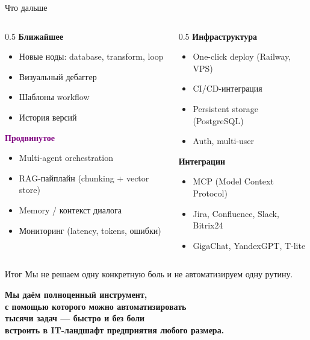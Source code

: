 \documentclass[aspectratio=169, 12pt]{beamer}
\begin{document}
\begin{frame}{Что дальше}
\begin{columns}[T]
\begin{column}{0.5\textwidth}
\textbf{\textcolor{accent}{Ближайшее}}
\begin{itemize}\small
    \item Новые ноды: database, transform, loop
    \item Визуальный дебаггер
    \item Шаблоны workflow
    \item История версий
\end{itemize}

\vspace{0.3cm}
\textbf{\textcolor{purple}{Продвинутое}}
\begin{itemize}\small
    \item Multi-agent orchestration
    \item RAG-пайплайн (chunking + vector store)
    \item Memory / контекст диалога
    \item Мониторинг (latency, tokens, ошибки)
\end{itemize}
\end{column}
\begin{column}{0.5\textwidth}
\textbf{\textcolor{ok}{Инфраструктура}}
\begin{itemize}\small
    \item One-click deploy (Railway, VPS)
    \item CI/CD-интеграция
    \item Persistent storage (PostgreSQL)
    \item Auth, multi-user
\end{itemize}

\vspace{0.3cm}
\textbf{\textcolor{warn}{Интеграции}}
\begin{itemize}\small
    \item MCP (Model Context Protocol)
    \item Jira, Confluence, Slack, Bitrix24
    \item GigaChat, YandexGPT, T-lite
\end{itemize}
\end{column}
\end{columns}
\end{frame}

\begin{frame}{Итог}
\centering
\vspace{0.4cm}
{\normalsize Мы не решаем одну конкретную боль и не автоматизируем одну рутину.}

\vspace{0.5cm}
{\large\bfseries Мы даём \textcolor{accent}{полноценный инструмент},\\[0.2cm]
с помощью которого можно автоматизировать\\[0.15cm]
\textcolor{accent}{тысячи задач} --- быстро и без боли\\[0.15cm]
встроить в IT-ландшафт предприятия любого размера.}
\end{frame}
\end{document}
